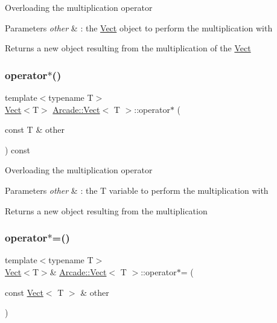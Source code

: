 Overloading the multiplication operator 
\begin{DoxyParams}{Parameters}
{\em other} & \+: the \hyperlink{class_arcade_1_1_vect}{Vect} object to perform the multiplication with \\
\hline
\end{DoxyParams}
\begin{DoxyReturn}{Returns}
a new object resulting from the multiplication of the \hyperlink{class_arcade_1_1_vect}{Vect} 
\end{DoxyReturn}
\mbox{\label{class_arcade_1_1_vect_a88a56be9ee5a46ff58f08714315840ac}} 
\subsubsection{\texorpdfstring{operator$\ast$()}{operator*()}\hspace{0.1cm}{\footnotesize\ttfamily [2/2]}}
{\footnotesize\ttfamily template$<$typename T$>$ \\
\hyperlink{class_arcade_1_1_vect}{Vect}$<$T$>$ \hyperlink{class_arcade_1_1_vect}{Arcade\+::\+Vect}$<$ T $>$\+::operator$\ast$ (\begin{DoxyParamCaption}\item[{const T \&}]{other }\end{DoxyParamCaption}) const\hspace{0.3cm}{\ttfamily [inline]}}

Overloading the multiplication operator 
\begin{DoxyParams}{Parameters}
{\em other} & \+: the T variable to perform the multiplication with \\
\hline
\end{DoxyParams}
\begin{DoxyReturn}{Returns}
a new object resulting from the multiplication 
\end{DoxyReturn}
\mbox{\label{class_arcade_1_1_vect_a555efa11a995294522ab2f84455c2fea}} 
\subsubsection{\texorpdfstring{operator$\ast$=()}{operator*=()}\hspace{0.1cm}{\footnotesize\ttfamily [1/2]}}
{\footnotesize\ttfamily template$<$typename T$>$ \\
\hyperlink{class_arcade_1_1_vect}{Vect}$<$T$>$\& \hyperlink{class_arcade_1_1_vect}{Arcade\+::\+Vect}$<$ T $>$\+::operator$\ast$= (\begin{DoxyParamCaption}\item[{const \hyperlink{class_arcade_1_1_vect}{Vect}$<$ T $>$ \&}]{other }\end{DoxyParamCaption})\hspace{0.3cm}{\ttfamily [inline]}}

